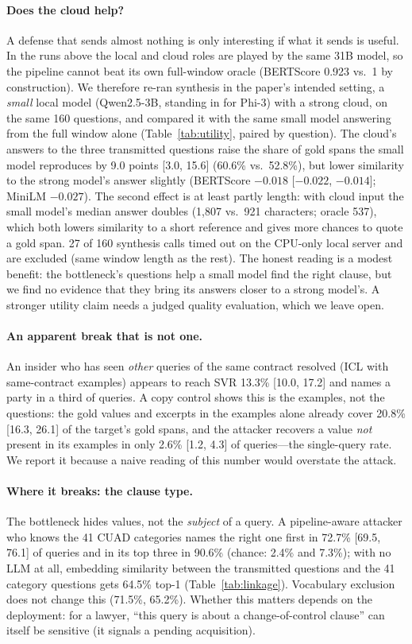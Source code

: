 \paragraph{Does the cloud help?} A defense that sends almost nothing is only interesting if what it sends is useful. In the runs above the local and cloud roles are played by the same 31B model, so the pipeline cannot beat its own full-window oracle (BERTScore 0.923 vs.\ 1 by construction). We therefore re-ran synthesis in the paper's intended setting, a \emph{small} local model (Qwen2.5-3B, standing in for Phi-3) with a strong cloud, on the same 160 questions, and compared it with the same small model answering from the full window alone (Table~\ref{tab:utility}, paired by question). The cloud's answers to the three transmitted questions raise the share of gold spans the small model reproduces by 9.0 points [3.0, 15.6] (60.6\% vs.\ 52.8\%), but lower similarity to the strong model's answer slightly (BERTScore $-0.018$ [$-0.022$, $-0.014$]; MiniLM $-0.027$). The second effect is at least partly length: with cloud input the small model's median answer doubles (1{,}807 vs.\ 921 characters; oracle 537), which both lowers similarity to a short reference and gives more chances to quote a gold span. 27 of 160 synthesis calls timed out on the CPU-only local server and are excluded (same window length as the rest). The honest reading is a modest benefit: the bottleneck's questions help a small model find the right clause, but we find no evidence that they bring its answers closer to a strong model's. A stronger utility claim needs a judged quality evaluation, which we leave open.

\paragraph{An apparent break that is not one.} An insider who has seen \emph{other} queries of the same contract resolved (ICL with same-contract examples) appears to reach SVR 13.3\% [10.0, 17.2] and names a party in a third of queries. A copy control shows this is the examples, not the questions: the gold values and excerpts in the examples alone already cover 20.8\% [16.3, 26.1] of the target's gold spans, and the attacker recovers a value \emph{not} present in its examples in only 2.6\% [1.2, 4.3] of queries---the single-query rate. We report it because a naive reading of this number would overstate the attack.

\paragraph{Where it breaks: the clause type.} The bottleneck hides values, not the \emph{subject} of a query. A pipeline-aware attacker who knows the 41 CUAD categories names the right one first in 72.7\% [69.5, 76.1] of queries and in its top three in 90.6\% (chance: 2.4\% and 7.3\%); with no LLM at all, embedding similarity between the transmitted questions and the 41 category questions gets 64.5\% top-1 (Table~\ref{tab:linkage}). Vocabulary exclusion does not change this (71.5\%, 65.2\%). Whether this matters depends on the deployment: for a lawyer, ``this query is about a change-of-control clause'' can itself be sensitive (it signals a pending acquisition).

